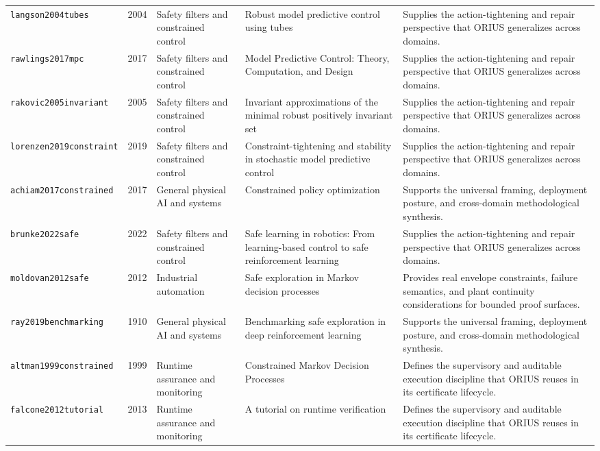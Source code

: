 \begin{longtable}{p{}p{}p{}p{}p{}}
\texttt{langson2004tubes} & 2004 & Safety filters and constrained control & Robust model predictive control using tubes & Supplies the action-tightening and repair perspective that ORIUS generalizes across domains.\\
\texttt{rawlings2017mpc} & 2017 & Safety filters and constrained control & Model Predictive Control: Theory, Computation, and Design & Supplies the action-tightening and repair perspective that ORIUS generalizes across domains.\\
\texttt{rakovic2005invariant} & 2005 & Safety filters and constrained control & Invariant approximations of the minimal robust positively invariant set & Supplies the action-tightening and repair perspective that ORIUS generalizes across domains.\\
\texttt{lorenzen2019constraint} & 2019 & Safety filters and constrained control & Constraint-tightening and stability in stochastic model predictive control & Supplies the action-tightening and repair perspective that ORIUS generalizes across domains.\\
\texttt{achiam2017constrained} & 2017 & General physical AI and systems & Constrained policy optimization & Supports the universal framing, deployment posture, and cross-domain methodological synthesis.\\
\texttt{brunke2022safe} & 2022 & Safety filters and constrained control & Safe learning in robotics: From learning-based control to safe reinforcement learning & Supplies the action-tightening and repair perspective that ORIUS generalizes across domains.\\
\texttt{moldovan2012safe} & 2012 & Industrial automation & Safe exploration in Markov decision processes & Provides real envelope constraints, failure semantics, and plant continuity considerations for bounded proof surfaces.\\
\texttt{ray2019benchmarking} & 1910 & General physical AI and systems & Benchmarking safe exploration in deep reinforcement learning & Supports the universal framing, deployment posture, and cross-domain methodological synthesis.\\
\texttt{altman1999constrained} & 1999 & Runtime assurance and monitoring & Constrained Markov Decision Processes & Defines the supervisory and auditable execution discipline that ORIUS reuses in its certificate lifecycle.\\
\texttt{falcone2012tutorial} & 2013 & Runtime assurance and monitoring & A tutorial on runtime verification & Defines the supervisory and auditable execution discipline that ORIUS reuses in its certificate lifecycle.\\

\end{longtable}
